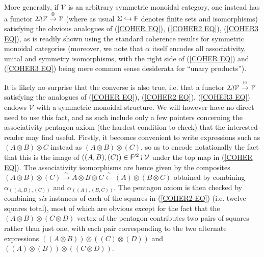 \documentclass[a4paper,10pt]{article}%
\begin{document}
\begin{remark}
More generally, if $\mathcal{V}$ is an arbitrary
symmetric monoidal category, one instead has a functor 
$\Sigma \wr \mathcal{V} \xrightarrow{\otimes} \mathcal{V}$
(where as usual $\Sigma \hookrightarrow \mathsf{F}$ denotes finite sets and isomorphisms) satisfying the obvious analogues of
(\ref{COHER EQ}), (\ref{COHER2 EQ}), (\ref{COHER3 EQ}),
as is readily shown using the standard coherence results for symmetric monoidal categories 
(moreover, we note that $\alpha$ itself encodes all associativity, unital and symmetry isomorphisms, with the 
right side of (\ref{COHER EQ}) and (\ref{COHER3 EQ})
being mere common sense desiderata for ``unary products'').

It is likely no surprise that the converse is also true, i.e. 
that a functor 
$\Sigma \wr \mathcal{V} \xrightarrow{\otimes} \mathcal{V}$
satisfying the analogues of 
(\ref{COHER EQ}), (\ref{COHER2 EQ}), (\ref{COHER3 EQ})
endows $\mathcal{V}$ with a symmetric monoidal structure.
We will however have no direct need to use this fact, and as such include only a few pointers concerning the associativity pentagon axiom (the hardest condition to check) that the interested reader may find useful. 
Firstly, it becomes convenient to write expressions such as
$(A \otimes B) \otimes C$ instead as 
$(A \otimes B) \otimes (C)$, so as to encode notationally the fact that this is the image of 
$((A,B),(C)) \in \mathsf{F}^{\wr 2} \wr \mathcal{V}$ under the top map in (\ref{COHER EQ}). The associativity isomorphisms are hence given by the composites
$
(A \otimes B) \otimes (C) \xrightarrow{\simeq} 
A \otimes B \otimes C \xleftarrow{\simeq}
(A) \otimes (B \otimes C)
$
obtained by combining 
$\alpha_{((A,B),(C))}$ 
and
$\alpha_{((A),(B,C))}$.
The pentagon axiom is then checked by combining \textit{six} instances of each of the squares in (\ref{COHER2 EQ}) (i.e. twelve squares total), most of which are obvious except for the fact that the $(A\otimes B) \otimes (C \otimes D)$ vertex of the pentagon contributes two pairs of squares rather than just one, with each pair corresponding to the two alternate expressions 
$((A \otimes B)) \otimes ((C) \otimes (D))$ and 
$((A) \otimes (B)) \otimes ((C \otimes D))$.
\end{remark}

\end{document}
